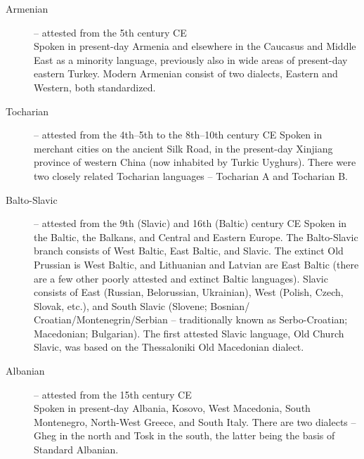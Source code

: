 \begin{description}
\item[Armenian] – attested from the 5th century CE\\
Spoken in present-day Armenia and elsewhere in the Caucasus and Middle East as
a minority language, previously also in wide areas of present-day eastern Turkey.
Modern Armenian consist of two dialects, Eastern and Western, both standardized.

\item[Tocharian] – attested from the 4th–5th to the 8th–10th century CE
Spoken in merchant cities on the ancient Silk Road, in the present-day Xinjiang
province of western China (now inhabited by Turkic Uyghurs). There were two
closely related Tocharian languages – Tocharian A and Tocharian B.

\item[Balto-Slavic] – attested from the 9th (Slavic) and 16th (Baltic) century CE
Spoken in the Baltic, the Balkans, and Central and Eastern Europe. The Balto-Slavic
branch consists of West Baltic, East Baltic, and Slavic. The extinct Old Prussian is
West Baltic, and Lithuanian and Latvian are East Baltic (there are a few other poorly
attested and extinct Baltic languages). Slavic consists of East (Russian, Belorussian,
Ukrainian), West (Polish, Czech, Slovak, etc.), and South Slavic (Slovene; Bosnian/
Croatian/Montenegrin/Serbian – traditionally known as Serbo-Croatian; Macedonian;
Bulgarian). The first attested Slavic language, Old Church Slavic, was based
on the Thessaloniki Old Macedonian dialect.

\item[Albanian] – attested from the 15th century CE\\
Spoken in present-day Albania, Kosovo, West Macedonia, South Montenegro,
North-West Greece, and South Italy. There are two dialects – Gheg in the north and
Tosk in the south, the latter being the basis of Standard Albanian.


\end{description}

